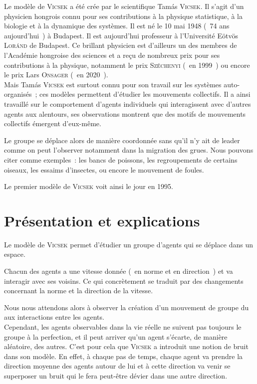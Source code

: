 \documentclass[french, a4paper, 12pt, openany]{report}
\begin{document}
	Le modèle de \textsc{Vicsek} a été crée par le scientifique Tamás \textsc{Vicsek}. Il s'agit d'un physicien hongrois connu pour ses contributions à la physique statistique, à la biologie et à la dynamique des systèmes. Il est né le 10 mai 1948 (~74 ans aujourd'hui~) à Budapest. Il est aujourd'hui professeur à l'Université Eötvös \textsc{Loránd} de Budapest. Ce brillant physicien est d'ailleurs un des membres de l'Académie hongroise des sciences et a reçu de nombreux prix pour ses contributions à la physique, notamment le prix \textsc{Széchenyi} (~en 1999~) ou encore le prix Lars \textsc{Onsager} (~en 2020~). \\

	Mais Tamás \textsc{Vicsek} est surtout connu pour son travail sur les systèmes auto-organisés~; ces modèles permettent d'étudier les mouvements collectifs. Il a ainsi travaillé sur le comportement d'agents individuels qui interagissent avec d'autres agents aux alentours, ses observations montrent que des motifs de mouvements collectifs émergent d'eux-même.
	
	Le groupe se déplace alors de manière coordonnée sans qu'il n'y ait de leader comme on peut l'observer notamment dans la migration des grues. Nous pouvons citer comme exemples~: les bancs de poissons, les regroupements de certains oiseaux, les essaims d'insectes, ou encore le mouvement de foules.

	 Le premier modèle de \textsc{Vicsek} voit ainsi le jour en 1995.\\
	 
	 
	 
	
\chapter{Présentation et explications}	

	Le modèle de \textsc{Vicsek} permet d'étudier un groupe d'agents qui se déplace dans un espace.
	
	Chacun des agents a une vitesse donnée (~en norme et en direction~) et va interagir avec ses voisins. Ce qui concrètement se traduit par des changements concernant la norme et la direction de la vitesse.
	
	Nous nous attendons alors à observer la création d'un mouvement de groupe du aux interactions entre les agents. \\
	
	Cependant, les agents observables dans la vie réelle ne suivent pas toujours le groupe à la perfection, et il peut arriver qu'un agent s'écarte, de manière aléatoire, des autres. C'est pour cela que \textsc{Vicsek} a introduit une notion de bruit dans son modèle. En effet, à chaque pas de temps, chaque agent va prendre la direction moyenne des agents autour de lui et à cette direction va venir se superposer un bruit qui le fera peut-être dévier dans une autre direction.
	
\end{document}
